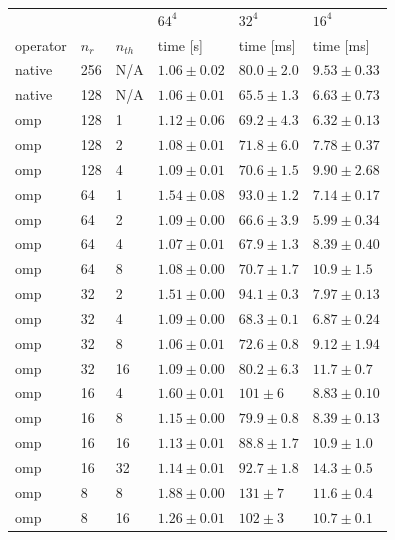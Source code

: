 \documentclass{article}
\theoremstyle{plain} %
\theoremstyle{convention} %
\theoremstyle{remark} %
\numberwithin{equation}{section}
\begin{document}
\begin{table}
    \centering
    \begin{tabular}{ |p{1.5cm}||p{1cm}|p{1cm}|p{2cm}|p{2cm}|p{2cm}| }
        \hline
        & & & $64^4$ & $32^4$ & $16^4$ \\
        operator & $n_r$ & $n_{th}$ & time [s] & time [ms] & time [ms] \\
        \hline
        native & 256 & N/A & $1.06 \pm 0.02$ & $80.0 \pm 2.0$ & $9.53 \pm 0.33$ \\
        native & 128 & N/A & $1.06 \pm 0.01$ & $65.5 \pm 1.3$ & $6.63 \pm 0.73$ \\
        \hline
        omp & 128 & 1 & $1.12 \pm 0.06$ & $69.2 \pm 4.3$ & $6.32 \pm 0.13$ \\
        omp & 128 & 2 & $1.08 \pm 0.01$ & $71.8 \pm 6.0$ & $7.78 \pm 0.37$ \\
        omp & 128 & 4 & $1.09 \pm 0.01$ & $70.6 \pm 1.5$ & $9.90 \pm 2.68$ \\
        \hline
        omp & 64 & 1 & $1.54 \pm 0.08$ & $93.0 \pm 1.2$ & $7.14 \pm 0.17$ \\
        omp & 64 & 2 & $1.09 \pm 0.00$ & $66.6 \pm 3.9$ & $5.99 \pm 0.34$ \\
        omp & 64 & 4 & $1.07 \pm 0.01$ & $67.9 \pm 1.3$ & $8.39 \pm 0.40$ \\
        omp & 64 & 8 & $1.08 \pm 0.00$ & $70.7 \pm 1.7$ & $10.9 \pm 1.5$ \\
        \hline
        omp & 32 & 2 & $1.51 \pm 0.00$ & $94.1 \pm 0.3$ & $7.97 \pm 0.13$ \\
        omp & 32 & 4 & $1.09 \pm 0.00$ & $68.3 \pm 0.1$ & $6.87 \pm 0.24$ \\
        omp & 32 & 8 & $1.06 \pm 0.01$ & $72.6 \pm 0.8$ & $9.12 \pm 1.94$ \\
        omp & 32 & 16 & $1.09 \pm 0.00$ & $80.2 \pm 6.3$ & $11.7 \pm 0.7$ \\
        \hline
        omp & 16 & 4 & $1.60 \pm 0.01$ & $101 \pm 6$ & $8.83 \pm 0.10$ \\
        omp & 16 & 8 & $1.15 \pm 0.00$ & $79.9 \pm 0.8$ & $8.39 \pm 0.13$ \\
        omp & 16 & 16 & $1.13 \pm 0.01$ & $88.8 \pm 1.7$ & $10.9 \pm 1.0$ \\
        omp & 16 & 32 & $1.14 \pm 0.01$ & $92.7 \pm 1.8$ & $14.3 \pm 0.5$ \\
        \hline
        omp & 8 & 8 & $1.88 \pm 0.00$ & $131 \pm 7$ & $11.6 \pm 0.4$ \\
        omp & 8 & 16 & $1.26 \pm 0.01$ & $102 \pm 3$ & $10.7 \pm 0.1$ \\

\end{tabular}
\end{table}
\end{document}

